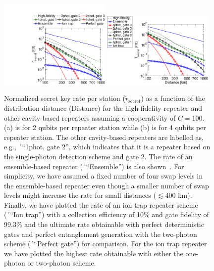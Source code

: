 \begin{figure} [H]
\centering
\includegraphics[width=0.48\textwidth]{./figs_Borregaard_PRA2015/figureX7a}
\includegraphics[width=0.48\textwidth]{./figs_Borregaard_PRA2015/figureX7b}
\caption[Optimal secret key rate I]
{Normalized secret key rate per station
($\tilde{r}_{\text{secret}}$) as a function of the distribution distance
(Distance) for the high-fidelity repeater and other cavity-based repeaters
assuming a cooperativity of $C=$100. (a) is for 2 qubits per repeater station
while (b) is for 4 qubits per repeater station. The other cavity-based repeaters
are labelled as, e.g., ´``1phot, gate 2'', which indicates that it is a
repeater based on the single-photon detection scheme and gate 2. The rate of an
ensemble-based repeater (´``Ensemble'') is also shown~\cite{sangouard1}. For
simplicity, we have assumed a fixed number of four swap levels in the
ensemble-based repeater even though a smaller number of swap levels might
increase the rate for small distances ($\lesssim400$ km). Finally, we have
plotted the rate of an ion trap repeater scheme (´``Ion trap'') with a
collection efficiency of 10\% and gate fidelity of 99.3\% and the ultimate rate
obtainable with perfect deterministic gates and perfect entanglement generation
with the two-photon scheme (´``Perfect gate'') for comparison. For the ion trap
repeater we have plotted the highest rate obtainable with either the one-photon
or two-photon scheme.}
\label{fig:figureX7}
\end{figure} 
